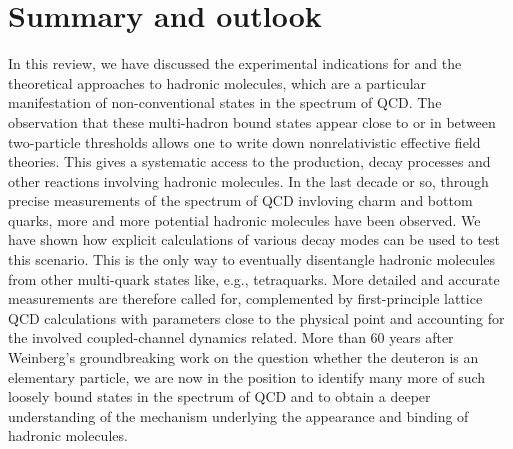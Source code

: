 
\section{Summary and outlook}
\label{sec:sum}


In this review, we have discussed the experimental indications for and
the theoretical approaches to hadronic molecules, which are a particular
manifestation of non-conventional states in the spectrum of QCD. The 
observation that these multi-hadron bound states appear close to or in 
between two-particle thresholds allows one to write down nonrelativistic
effective field theories. This gives a systematic access to the production,
decay processes and other reactions involving hadronic molecules. In the last
decade or so, through precise measurements of the spectrum of QCD invloving 
charm and bottom quarks, more and more potential hadronic molecules have
been observed. We have shown how explicit calculations of various decay modes
can be used to test this scenario. This is the only way to eventually
disentangle hadronic molecules from other multi-quark states like, e.g., 
tetraquarks. More detailed and accurate measurements are therefore called
for, complemented by first-principle lattice QCD calculations with
parameters close to the physical point and accounting for the 
involved coupled-channel dynamics related. More than 60 years after
Weinberg's groundbreaking work on the question whether the deuteron is an
elementary particle, we are now in the position to identify many more of such
loosely bound states in the spectrum of QCD and to obtain a deeper 
understanding of the mechanism underlying the appearance and binding 
of hadronic molecules.
